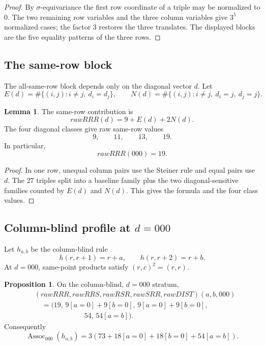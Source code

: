 \documentclass[11pt]{article}
\theoremstyle{definition}
\newtheorem{lemma}[theorem]{Lemma}
\newtheorem{proposition}[theorem]{Proposition}
\begin{document}
\begin{proof}
By \(\sigma\)-equivariance the first row coordinate of a
triple may be normalized to \(0\). The two remaining row variables and
the three column variables give \(3^5\) normalized cases; the factor
\(3\) restores the three translates. The displayed blocks are the five
equality patterns of the three rows.
\end{proof}

\subsection{The same-row block}\label{the-same-row-block}

The all-same-row block depends only on the diagonal vector \(d\). Let \[
E(d)=\#\{(i,j):i\ne j,
\ d_i=d_j\},
\qquad
N(d)=\#\{(i,j):i\ne j,
\ d_i=j,
\ d_j=j\}.
\]

\begin{lemma}
\label{lem:4.2}
The same-row contribution is \[
rawRRR(d)=9+E(d)+2N(d).
\] The four diagonal classes give raw same-row values \[
9,\qquad 11,\qquad 13,\qquad 19.
\] In particular, \[
rawRRR(000)=19.
\]
\end{lemma}

\begin{proof}
In one row, unequal column pairs use the Steiner rule
and equal pairs use \(d\). The \(27\) triples split into a baseline
family plus the two diagonal-sensitive families counted by \(E(d)\) and
\(N(d)\). This gives the formula and the four class values.
\end{proof}

\subsection{\texorpdfstring{Column-blind profile at
\(d=000\)}{Column-blind profile at d=000}}\label{column-blind-profile-at-d000}

Let \(h_{a,b}\) be the column-blind rule \[
h(r,r+1)=r+a,
\qquad
h(r,r+2)=r+b.
\] At \(d=000\), same-point products satisfy \((r,c)^2=(r,r)\).

\begin{proposition}
\label{prop:4.3}
On the column-blind, \(d=000\) stratum, \[
\begin{aligned}
&(rawRRR,rawRRS,rawRSR,rawSRR,rawDIST)(a,b,000)\\
&\quad =
\bigl(19,\, 9[a=0]+9[b=0],\, 9[a=0]+9[b=0],\\
&\hspace{7em}54,\,54[a=b]\bigr).
\end{aligned}
\] Consequently \[
\boxed{
\operatorname{Assoc}_{000}(h_{a,b})
=
3\left(73+18[a=0]+18[b=0]+54[a=b]\right).
}
\]
\end{proposition}
\end{document}
